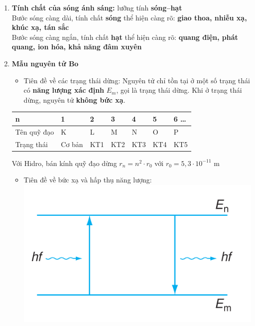\documentclass[a4paper,12pt,titlepage,twocolumn]{article}
\newenvironment{myitemize} 
{ \begin{itemize}[leftmargin=*,label=-]  %
		\setlength{\itemsep}{0pt}
		\setlength{\parskip}{0pt}
		\setlength{\parsep}{0pt}     }
{ \end{itemize}                  }
\newenvironment{myenumerate}
{ \begin{enumerate}[label=\textbf{\arabic*}.]
\setlist{nolistsep} %
\setlength{\itemsep}{0pt}
\setlength{\parskip}{0pt}
\setlength{\parsep}{0pt}	}
{ \end{enumerate}}
\begin{document}
\begin{myenumerate}
\begin{myitemize}
	\end{myitemize}
	\item \textbf{Tính chất của sóng ánh sáng:} lưỡng tính \textbf{sóng--hạt} \\
	Bước sóng càng dài, tính chất \textbf{sóng} thể hiện càng rõ: \textbf{giao thoa, nhiễu xạ, khúc xạ, tán sắc} \\
	Bước sóng càng ngắn, tính chất \textbf{hạt} thể hiện càng rõ: \textbf{quang điện, phát quang, ion hóa, khả năng đâm xuyên}
	\item \textbf{Mẫu nguyên tử Bo} 
	\begin{myitemize}
		\item Tiên đề về các trạng thái dừng: Nguyên tử chỉ tồn tại ở một số trạng thái có \textbf{năng lượng xác định}
		$E_m$, gọi là trạng thái dừng. Khi ở trạng thái dừng, nguyên tử \textbf{không bức xạ}.
	\end{myitemize}
	\begin{adjustwidth}{-0.9cm}{}
	\begin{tabular}{|m{2.4cm}|m{0.75cm}|m{0.75cm}|m{0.75cm}|m{0.75cm}|m{0.75cm}|m{1cm}|}
		\hline
		n & 1 & 2 & 3 & 4 & 5 & 6 \ldots \\ \hline
		Tên quỹ đạo & K & L & M & N & O & P \\ \hline
		Trạng thái & Cơ bản & KT1 & KT2 & KT3 & KT4 & KT5 \\ \hline	
	\end{tabular}
	\end{adjustwidth}
	Với Hidro, bán kính quỹ đạo dừng $r_n = n^2 \cdot r_0$ với $r_0 = 5,3 \cdot 10^{-11}$ \si{\meter}
	\begin{myitemize}
		\item Tiên đề về bức xạ và hấp thụ năng lượng:
		\includegraphics[scale=0.2]{image.png}

\end{myitemize}
\end{myenumerate}
\end{document}
